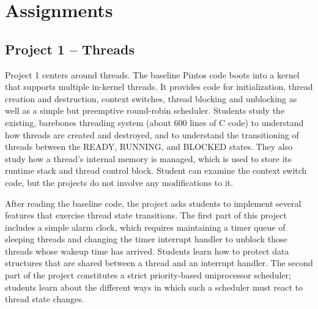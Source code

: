 \section{Assignments}
\label{sec:assignments}

\pintostestcounttable{}

%
%

\subsection{Project 1 -- Threads}
Project 1 centers around threads.  The baseline Pintos code boots into a kernel that
supports multiple in-kernel threads.  It provides code for initialization, thread creation and
destruction, context switches, thread blocking and unblocking as well as a simple but
preemptive round-robin scheduler.
Students study the existing, barebones threading system (about 600 lines of C code) to 
understand how threads are created and destroyed, and to understand the transitioning of 
threads between the READY, RUNNING, and BLOCKED states.  They also study how a thread's
internal memory is managed, which is used to store its runtime stack and thread control block.
Student can examine the context switch code, but the projects do not involve any modifications
to it.

After reading the baseline code, the project asks students to implement several features
that exercise thread state transitions.  The first part of this project includes a simple
alarm clock, which requires maintaining a timer queue of sleeping threads and changing 
the timer interrupt handler to unblock those threads whose wakeup time has arrived.
Students learn how to protect data structures that are shared between a thread and an
interrupt handler.  The second part of the project constitutes a strict priority-based
uniprocessor scheduler; students learn about the different ways in which 
such a scheduler must react to thread state changes.

